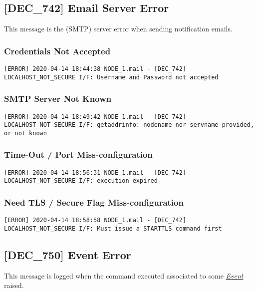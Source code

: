 \documentclass[dec_sum_main.tex]{subfiles}
\begin{document}
\label{DEC742}
\subsection{[DEC\_742] Email Server Error}
This message is the (SMTP) server error when sending notification emails.

\subsubsection{Credentials Not Accepted}

\begin{verbatim}
[ERROR] 2020-04-14 18:44:38 NODE_1.mail - [DEC_742] LOCALHOST_NOT_SECURE I/F: Username and Password not accepted
\end{verbatim}

\subsubsection{SMTP Server Not Known}

\begin{verbatim}
[ERROR] 2020-04-14 18:49:42 NODE_1.mail - [DEC_742] LOCALHOST_NOT_SECURE I/F: getaddrinfo: nodename nor servname provided, or not known
\end{verbatim}

\subsubsection{Time-Out / Port Miss-configuration}
\begin{verbatim}
[ERROR] 2020-04-14 18:56:31 NODE_1.mail - [DEC_742] LOCALHOST_NOT_SECURE I/F: execution expired
\end{verbatim}

\subsubsection{Need TLS / Secure Flag Miss-configuration}
\begin{verbatim}
[ERROR] 2020-04-14 18:58:58 NODE_1.mail - [DEC_742] LOCALHOST_NOT_SECURE I/F: Must issue a STARTTLS command first
\end{verbatim}

\label{DEC750}
\subsection{[DEC\_750] Event Error}
This message is logged when the command executed associated to some \hyperref[Events]{\textit{Event}} raised.
\end{document}
